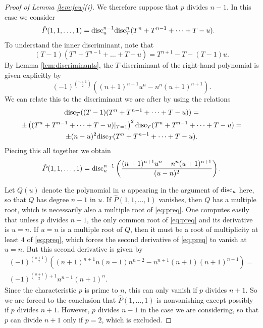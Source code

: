 \documentclass[a4paper]{compositio}
\begin{document}
\begin{proof}[Proof of Lemma \ref{lem:few}(i)]
We therefore suppose that $p$ divides $n-1$. In this case we
consider
\begin{align*}
 \hat{P}(1,1,\dots,1) &= \mathrm{disc}_u^{n-1} \mathrm{disc}_{T}^n(T^n + T^{n-1} + \dots
 + T - u).
\end{align*}
To understand the inner discriminant, note that
\[ (T-1)(T^n + T^{n-1} + \dots + T - u)= T^{n+1} - T - (T-1)u. \]
By Lemma \ref{lem:discriminants}, the $T$-discriminant of the
right-hand polynomial is given explicitly by
\begin{equation}\label{eq:preq} (-1)^{\binom{n+1}{2}}\left((n+1)^{n+1} u^n - n^n (u+1)^{n+1}\right).
\end{equation} We can relate this to the discriminant we are after
by using the relations
\begin{multline*}  \mathrm{disc}_T((T-1)
(T^n + T^{n-1} + \dots
 + T - u)) = \\\pm\left((T^n + T^{n-1} + \dots + T-u)|_{T=1}\right)^2 \mathrm{disc}_T(T^n + T^{n-1}+\dots
 + T - u) =\\
\pm (n-u)^2 \mathrm{disc}_T(T^n + T^{n-1}+ \dots
 + T - u).
 \end{multline*} Piecing this all together we obtain
\[ \hat{P}(1,1,\dots,1) = \mathrm{disc}_u^{n-1}\left(\frac{(n+1)^{n+1} u^n
- n^n (u+1)^{n+1}}{(u-n)^2}\right). \]

Let $Q(u)$ denote the polynomial in $u$ appearing in the argument of
$\mathrm{disc}_u$ here, so that $Q$ has degree $n-1$ in $u$. If
$\hat{P}(1,1,\dots,1)$ vanishes, then $Q$ has a multiple root, which
is necessarily also a multiple root of \eqref{eq:preq}. One computes
easily that unless $p$ divides $n+1$, the only common root of
\eqref{eq:preq} and its derivative is $u=n$. If $u=n$ is a multiple
root of $Q$, then it must be a root of multiplicity at least $4$ of
\eqref{eq:preq}, which forces the second derivative of
\eqref{eq:preq} to vanish at $u=n$. But this second derivative is
given by \begin{multline*} (-1)^{\binom{n+1}{2}} \left((n+1)^{n+1} n
(n-1) n^{n-2} - n^{n+1} (n+1) (n+1)^{n-1}\right) =
\\ (-1)^{\binom{n+1}{2}+1}n^{n-1} (n+1)^n. \end{multline*} Since the characteristic
$p$ is prime to $n$, this can only vanish if $p$ divides $n+1$. So
we are forced to the conclusion that $\hat{P}(1,\dots,1)$ is
nonvanishing except possibly if $p$ divides $n+1$. However, $p$
divides $n-1$ in the case we are considering, so that $p$ can divide
$n+1$ only if $p=2$, which is excluded.
\end{proof}
\end{document}
